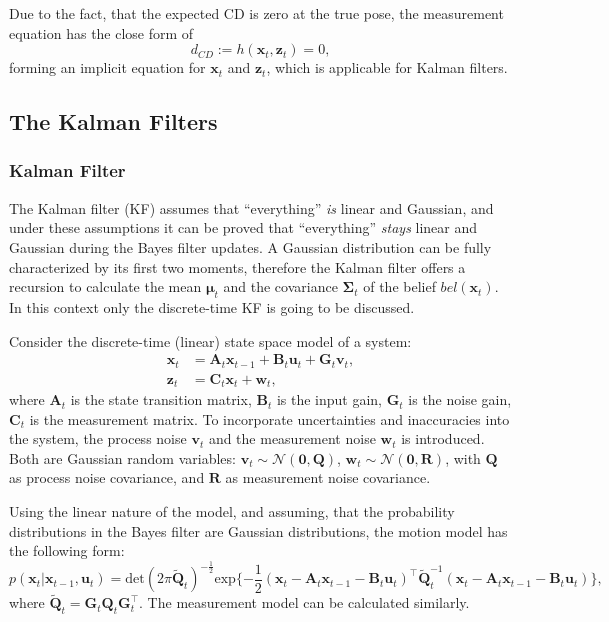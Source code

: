 Due to the fact, that the expected CD is zero at the true pose,
the measurement equation has the close form of
\begin{equation}
    d_{CD} :=h(\mathbf{x}_t,\mathbf{z}_t) = 0,
\end{equation}
forming an implicit equation for $\mathbf{x}_t$ and $\mathbf{z}_t$, which is
applicable for Kalman filters.

\subsection{The Kalman Filters}
\subsubsection{Kalman Filter}
The Kalman filter (KF) assumes that ``everything'' \emph{is} linear and Gaussian, and under these assumptions it can be proved that ``everything'' \emph{stays} linear and Gaussian during the Bayes filter updates. A Gaussian distribution can be fully characterized by its first two moments, therefore the Kalman filter offers a recursion to calculate the mean $\boldsymbol{\mu}_t$ and the covariance $\mathbf{\Sigma}_t$ of the belief $bel(\mathbf{x}_t)$. In this context only the discrete-time KF is going to be discussed.

Consider the discrete-time (linear) state space model of a system:
\begin{align}\label{key}
    \mathbf{x}_t & = \mathbf{A}_t\mathbf{x}_{t-1} + \mathbf{B}_t\mathbf{u}_t + \mathbf{G}_t\mathbf{v}_t, \\
    \mathbf{z}_t & = \mathbf{C}_t\mathbf{x}_t + \mathbf{w}_t,
\end{align}
where $\mathbf{A}_t$ is the state transition matrix, $\mathbf{B}_t$ is the input gain, $\mathbf{G}_t$ is the noise gain, $\mathbf{C}_t$ is the measurement matrix. To incorporate uncertainties and inaccuracies into the system, the process noise $\mathbf{v}_t$ and the measurement noise $\mathbf{w}_t$ is introduced. Both are Gaussian random variables: $\mathbf{v}_t \sim \mathcal{N}(\mathbf{0},\mathbf{Q})$, $\mathbf{w}_t \sim \mathcal{N}(\mathbf{0},\mathbf{R})$, with $\mathbf{Q}$ as process noise covariance, and $\mathbf{R}$ as measurement noise covariance.

Using the linear nature of the model, and assuming, that the probability distributions in the Bayes filter are Gaussian distributions, the motion model has the following form:
\begin{equation}\label{key}
    p(\mathbf{x}_t|\mathbf{x}_{t-1}, \mathbf{u}_t) = \mathrm{det}(2\pi{\tilde{\mathbf{Q}}_t})^{-\frac{1}{2}}\mathrm{exp}\{-\frac{1}{2}(\mathbf{x}_t-\mathbf{A}_t\mathbf{x}_{t-1}-\mathbf{B}_t\mathbf{u}_t)^\top\tilde{\mathbf{Q}}_t^{-1}(\mathbf{x}_t-\mathbf{A}_t\mathbf{x}_{t-1}-\mathbf{B}_t\mathbf{u}_t)\},
\end{equation}
where $\tilde{\mathbf{Q}}_t = \mathbf{G}_t\mathbf{Q}_t\mathbf{G}_t^\top$.
The measurement model can be calculated similarly.

